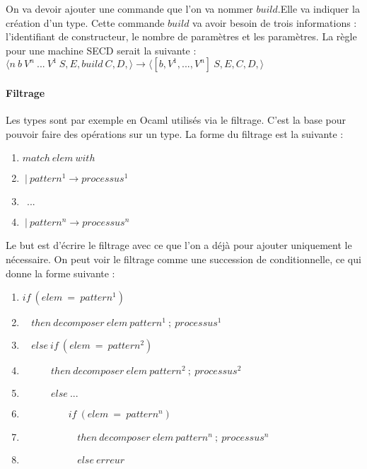 \documentclass[10pt,a4paper]{report}
\begin{document}
		On va devoir ajouter une commande que l'on va nommer $build$.Elle va indiquer la création d'un type. Cette commande $build$ va avoir besoin de trois informations : l'identifiant de constructeur, le nombre de paramètres et les paramètres. La règle pour une machine SECD serait la suivante :
		\smallbreak
		$\langle n~b~V^{n}~...~V^{1}~S,E,build~C,D,\rangle
		\longrightarrow
		\langle [b,V^{1},...,V^{n}]~S,E,C,D,\rangle$
		
	\paragraph{Filtrage } Les types sont par exemple en Ocaml utilisés via le filtrage. C'est la base pour pouvoir faire des opérations sur un type. La forme du filtrage est la suivante :
	\begin{enumerate}
		\item $match~elem~with$
		\item $~|~pattern^{1} \rightarrow processus^{1}$
		\item $~~...$
		\item $~|~pattern^{n} \rightarrow processus^{n}$
	\end{enumerate}
	\bigbreak
	
	
	Le but est d'écrire le filtrage avec ce que l'on a déjà pour ajouter uniquement le nécessaire. On peut voir le filtrage comme une succession de conditionnelle, ce qui donne la forme suivante :
	\begin{enumerate}
		\item $if~(elem~=~pattern^{1})$
		\item $~~~~then~decomposer~elem~pattern^{1}~;~processus^{1}$
		\item $~~~~else~if~(elem~=~pattern^{2})$
		\item $~~~~~~~~~~~~~then~decomposer~elem~pattern^{2}~;~processus^{2}$
		\item $~~~~~~~~~~~~~else~...$
		\item $~~~~~~~~~~~~~~~~~~~~~if~(elem~=~pattern^{n})$
		\item $~~~~~~~~~~~~~~~~~~~~~~~~~then~decomposer~elem~pattern^{n}~;~processus^{n}$
		\item $~~~~~~~~~~~~~~~~~~~~~~~~~else~erreur$
	\end{enumerate}
	\bigbreak
	
\end{document}
